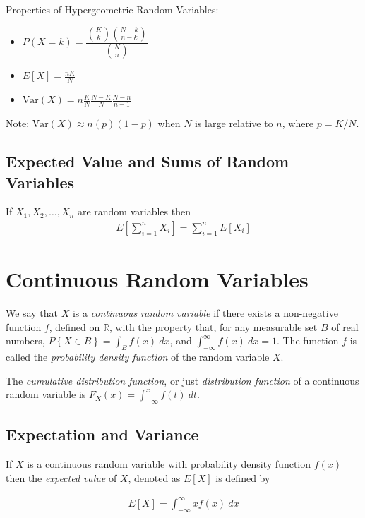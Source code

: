 \documentclass[10pt]{article}
\begin{document}
			Properties of Hypergeometric Random Variables:
		\begin{multicols}{3}
			\begin{itemize}
				\item $P(X=k) = \dfrac{{K \choose k} {{N-k} \choose {n-k}}}{{N \choose n}}$
				\item $E[X] = \frac{nK}{N}$
				\item $\text{Var}(X)= n \frac{K}{N} \frac{N-K}{N} \frac{N-n}{n-1}$
			\end{itemize}
		\end{multicols}
		Note: $\text{Var}(X) \approx n(p)(1-p)$ when $N$ is large relative to $n$, where $p=K/N$.
		
		\subsection*{Expected Value and Sums of Random Variables}
		If $X_1, X_2, \ldots, X_n$ are random variables then
		\begin{align*}
			E \left[ \sum_{i=1}^{n} X_i \right] = \sum_{i=1}^{n} E[X_i]
		\end{align*}
		
		\newpage
		
		\section{Continuous Random Variables}
		We say that $X$ is a \emph{continuous random variable} if there exists a non-negative function $f$, defined on $\mathbb{R}$, with the property that, for any measurable set $B$ of real numbers, $P\left\{ X \in B \right\} = \int_{B} f(x)\: dx$, and $\int_{-\infty}^{\infty}f(x)\:dx = 1$. The function $f$ is called the \emph{probability density function} of the random variable $X$.
		
		The \emph{cumulative distribution function}, or just \emph{distribution function} of a continuous random variable is $F_X(x) = \int_{-\infty}^{x}f(t)\: dt$.
		
		\subsection*{Expectation and Variance}
		If $X$ is a continuous random variable with probability density function $f(x)$ then the \emph{expected value} of $X$, denoted as $E[X]$ is defined by
		
		\begin{align*}
			E[X] = \int_{-\infty}^{\infty} xf(x)\:dx
		\end{align*}
		
\end{document}
